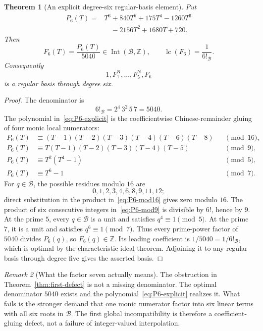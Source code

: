 \documentclass[11pt,oneside]{article}
\newtheorem{theorem}{Theorem}[section]
\theoremstyle{definition}
\theoremstyle{remark}
\newtheorem{remark}[theorem]{Remark}
\newcommand{\Z}{\mathbb Z}
\newcommand{\B}{\mathcal B}
\newcommand{\Int}{\operatorname{Int}}
\begin{document}
\begin{theorem}[An explicit degree-six regular-basis element]
\label{thm:explicit-F6}
Put
\begin{align}
 P_6(T)={}&T^6+840T^5+175T^4-1260T^3 \\
          &\quad-2156T^2+1680T+720.
 \label{eq:P6-explicit}
\end{align}
Then
\begin{equation}
 F_6(T)=\frac{P_6(T)}{5040}\in\Int(\B,\Z),
 \qquad
 \operatorname{lc}(F_6)=\frac1{6!_{\B}}.
 \label{eq:F6-explicit}
\end{equation}
Consequently
\[
 1,F_1^{\mathrm N},\ldots,F_5^{\mathrm N},F_6
\]
is a regular basis through degree six.
\end{theorem}

\begin{proof}
The denominator is
\[
 6!_{\B}=2^4\,3^2\,5\,7=5040.
\]
The polynomial in~\eqref{eq:P6-explicit} is the coefficientwise Chinese-remainder gluing of
four monic local numerators:
\begin{align}
 P_6(T)&\equiv (T-1)(T-2)(T-3)(T-4)(T-6)(T-8) &&\pmod {16},
 \label{eq:P6-mod16}\\
 P_6(T)&\equiv T(T-1)(T-2)(T-3)(T-4)(T-5) &&\pmod 9,
 \label{eq:P6-mod9}\\
 P_6(T)&\equiv T^2(T^4-1) &&\pmod 5,
 \label{eq:P6-mod5}\\
 P_6(T)&\equiv T^6-1 &&\pmod 7.
 \label{eq:P6-mod7}
\end{align}
For \(q\in\B\), the possible residues modulo \(16\) are
\[
 0,1,2,3,4,6,8,9,11,12;
\]
direct substitution in the product in~\eqref{eq:P6-mod16} gives zero modulo \(16\).
The product of six consecutive integers in~\eqref{eq:P6-mod9} is divisible by \(6!\), hence
by \(9\).  At the prime \(5\), every \(q\in\B\) is a unit and satisfies \(q^4\equiv1\pmod5\).
At the prime \(7\), it is a unit and satisfies \(q^6\equiv1\pmod7\).  Thus every prime-power
factor of \(5040\) divides \(P_6(q)\), so \(F_6(q)\in\Z\).
Its leading coefficient is \(1/5040=1/6!_{\B}\), which is optimal by the characteristic-ideal
theorem.  Adjoining it to any regular basis through degree five gives the asserted basis.
\end{proof}

\begin{remark}[What the factor seven actually means]
The obstruction in Theorem~\ref{thm:first-defect} is not a missing denominator.  The optimal
denominator \(5040\) exists and the polynomial~\eqref{eq:P6-explicit} realizes it.  What fails
is the stronger demand that one monic numerator factor into six linear terms with all six
roots in \(\B\).  The first global incompatibility is therefore a coefficient-gluing defect,
not a failure of integer-valued interpolation.
\end{remark}
\end{document}

